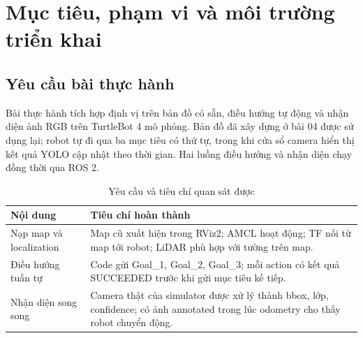 \section{Mục tiêu, phạm vi và môi trường triển khai}
\subsection{Yêu cầu bài thực hành}
Bài thực hành tích hợp định vị trên bản đồ có sẵn, điều hướng tự động và nhận diện ảnh RGB trên TurtleBot 4 mô phỏng. Bản đồ đã xây dựng ở bài 04 được sử dụng lại; robot tự đi qua ba mục tiêu có thứ tự, trong khi cửa sổ camera hiển thị kết quả YOLO cập nhật theo thời gian. Hai luồng điều hướng và nhận diện chạy đồng thời qua ROS 2.
\begin{table}[H]\centering\small
\caption{Yêu cầu và tiêu chí quan sát được}\label{tab:requirements}
\begin{tabularx}{\linewidth}{@{}P{3.5cm}Y@{}}\toprule
Nội dung&Tiêu chí hoàn thành\\\midrule
Nạp map và localization&Map cũ xuất hiện trong RViz2; AMCL hoạt động; TF nối từ map tới robot; LiDAR phù hợp với tường trên map.\\
Điều hướng tuần tự&Code gửi Goal\_1, Goal\_2, Goal\_3; mỗi action có kết quả SUCCEEDED trước khi gửi mục tiêu kế tiếp.\\
Nhận diện song song&Camera thật của simulator được xử lý thành bbox, lớp, confidence; có ảnh annotated trong lúc odometry cho thấy robot chuyển động.\\\bottomrule
\end{tabularx}\end{table}
